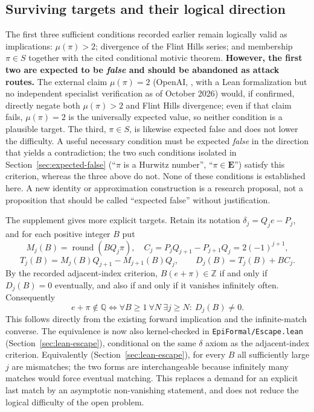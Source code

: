 \documentclass[11pt]{amsart}
\theoremstyle{definition}
\theoremstyle{remark}
\numberwithin{equation}{section}
\newcommand{\Q}{\mathbb{Q}}
\newcommand{\Z}{\mathbb{Z}}
\newcommand{\irr}{\mu}
\begin{document}
\subsection{Surviving targets and their logical direction}

The first three sufficient conditions recorded earlier remain logically valid as implications: $\irr(\pi)>2$; divergence of the Flint Hills series; and membership $\pi\in S$ together with the cited conditional motivic theorem. \textbf{However, the first two are expected to be \emph{false} and should be abandoned as attack routes.} The external claim $\irr(\pi)=2$ (OpenAI, \cite{OpenAI2026}, with a Lean formalization but no independent specialist verification as of October 2026) would, if confirmed, directly negate both $\irr(\pi)>2$ and Flint Hills divergence; even if that claim fails, $\irr(\pi)=2$ is the universally expected value, so neither condition is a plausible target. The third, $\pi\in S$, is likewise expected false and does not lower the difficulty. A useful necessary condition must be expected \emph{false} in the direction that yields a contradiction; the two such conditions isolated in Section~\ref{sec:expected-false} (``$\pi$ is a Hurwitz number'', ``$\pi\in\mathbf{E}$'') satisfy this criterion, whereas the three above do not. None of these conditions is established here. A new identity or approximation construction is a research proposal, not a proposition that should be called ``expected false'' without justification.

The supplement gives more explicit targets. Retain its notation $\delta_j=Q_je-P_j$, and for each positive integer $B$ put
\[
M_j(B)=\operatorname{round}(BQ_j\pi),\quad
C_j=P_jQ_{j+1}-P_{j+1}Q_j=2(-1)^{j+1},
\]
\[
T_j(B)=M_j(B)Q_{j+1}-M_{j+1}(B)Q_j,\qquad
D_j(B)=T_j(B)+BC_j.
\]
By the recorded adjacent-index criterion, $B(e+\pi)\in\Z$ if and only if $D_j(B)=0$ eventually, and also if and only if it vanishes infinitely often. Consequently
\[
e+\pi\notin\Q
\iff \forall B\ge1\ \forall N\ \exists j\ge N:\ D_j(B)\ne0.
\]
This follows directly from the existing forward implication and the infinite-match converse. The equivalence is now also kernel-checked in \texttt{EpiFormal/Escape.lean} (Section~\ref{sec:lean-escape}), conditional on the same $\delta$ axiom as the adjacent-index criterion. Equivalently (Section~\ref{sec:lean-escape}), for every $B$ all sufficiently large $j$ are mismatches; the two forms are interchangeable because infinitely many matches would force eventual matching. This replaces a demand for an explicit last match by an asymptotic non-vanishing statement, and does not reduce the logical difficulty of the open problem.
\end{document}
